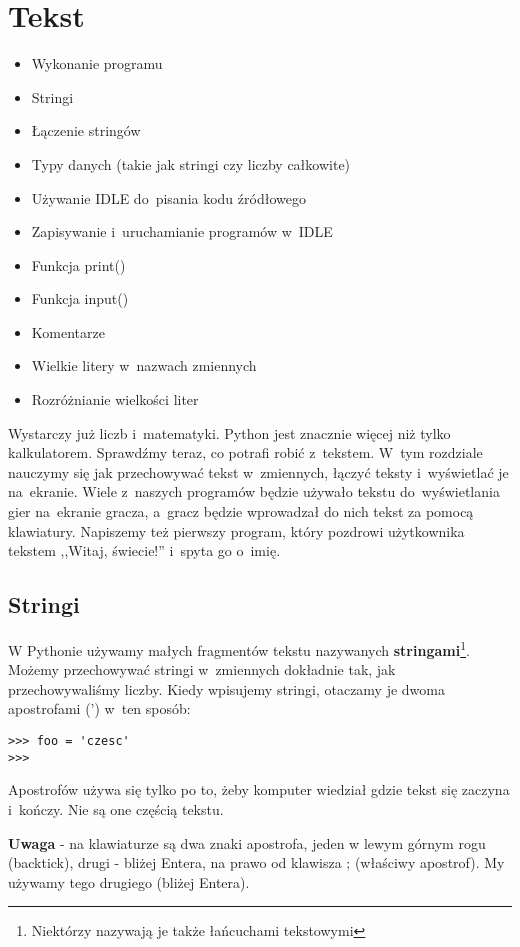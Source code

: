 \documentclass{book}
\newcommand{\btopicscovered}{
	\begin{graybox}
	\begin{itemize}
}
\newcommand{\etopicscovered}{
	\end{itemize}
	\end{graybox}
}
\begin{document}
\chapter{Tekst}

\btopicscovered
	\item Wykonanie programu
	\item Stringi
	\item Łączenie stringów
	\item Typy danych (takie jak stringi czy liczby całkowite)
	\item Używanie IDLE do~pisania kodu źródłowego
	\item Zapisywanie i~uruchamianie programów w~IDLE
	\item Funkcja print()
	\item Funkcja input()
	\item Komentarze
	\item Wielkie litery w~nazwach zmiennych
	\item Rozróżnianie wielkości liter
\etopicscovered

Wystarczy już liczb i~matematyki. Python jest znacznie więcej niż tylko kalkulatorem. Sprawdźmy teraz, co potrafi robić z~tekstem. W~tym rozdziale nauczymy się jak przechowywać tekst w~zmiennych, łączyć teksty i~wyświetlać je na~ekranie. Wiele z~naszych programów będzie używało tekstu do~wyświetlania gier na~ekranie gracza, a~gracz będzie wprowadzał do nich tekst za pomocą klawiatury. Napiszemy też pierwszy program, który pozdrowi użytkownika tekstem ,,Witaj, świecie!'' i~spyta go o~imię.

\section{Stringi}

W Pythonie używamy małych fragmentów tekstu nazywanych {\bf stringami}\footnote{Niektórzy nazywają je także łańcuchami tekstowymi}. Możemy przechowywać stringi w~zmiennych dokładnie tak, jak przechowywaliśmy liczby. Kiedy wpisujemy stringi, otaczamy je dwoma apostrofami (') w~ten sposób:

\begin{lstlisting}
>>> foo = 'czesc'
>>>
\end{lstlisting}

Apostrofów używa się tylko po to, żeby komputer wiedział gdzie tekst się zaczyna i~kończy. Nie są one częścią tekstu.

{\bf Uwaga} - na klawiaturze są dwa znaki apostrofa, jeden w lewym górnym rogu (backtick), drugi - bliżej Entera, na prawo od klawisza ; (właściwy apostrof). My używamy tego drugiego (bliżej Entera).
\end{document}
